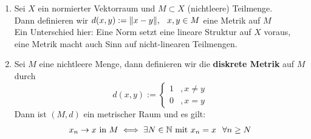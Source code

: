 \begin{beispiel}
	\begin{enumerate}[label=\alph*\upshape)]
		\item Sei $X$ ein normierter Vektorraum und $M \subset X$ (nichtleere) Teilmenge. \\
		Dann definieren wir $d(x, y) := \| x - y\|, \hspace{0.25cm} x, y \in M$ eine Metrik auf $M$ \\
		Ein Unterschied hier: Eine Norm setzt eine lineare Struktur auf $X$ voraus, eine Metrik macht auch Sinn auf nicht-linearen Teilmengen.
		 \label{bsp:1-diskreteMetrik}
		\item Sei $M$ eine nichtleere Menge, dann definieren wir die \textbf{diskrete Metrik} auf $M$ durch
			\[ d(x, y) := \begin{cases}1 &, x \neq y \\ 0 &, x = y\end{cases} \]
			Dann ist $(M, d)$ ein metrischer Raum und es gilt: 
				\[ x_{n} \rightarrow x \text{ in } M \iff \exists N \in \mathbb{N} \text{ mit } x_{n} = x \hspace{0.25cm} \forall n \geq N \]
	\end{enumerate}	
\end{beispiel}

